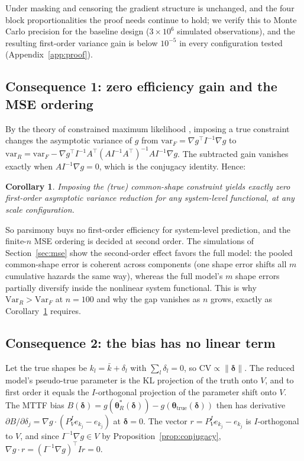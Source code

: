 \documentclass[11pt]{article}
\renewcommand{\v}[1]{\boldsymbol{#1}}
\newcommand{\CV}{\mathrm{CV}}
\newtheorem{corollary}{Corollary}[section]
\begin{document}
Under masking and censoring the gradient structure is unchanged, and the four block proportionalities the proof needs continue to hold; we verify this to Monte Carlo precision for the baseline design ($3\times 10^6$ simulated observations), and the resulting first-order variance gain is below $10^{-5}$ in every configuration tested (Appendix~\ref{app:proof}).

\subsection{Consequence 1: zero efficiency gain and the MSE ordering}

By the theory of constrained maximum likelihood \citep{aitchison1958, silvey1959}, imposing a true constraint changes the asymptotic variance of $g$ from $\mathrm{var}_F = \nabla g^\top I^{-1}\nabla g$ to $\mathrm{var}_R = \mathrm{var}_F - \nabla g^\top I^{-1} A^\top (A I^{-1} A^\top)^{-1} A I^{-1}\nabla g$. The subtracted gain vanishes exactly when $A I^{-1}\nabla g = 0$, which is the conjugacy identity. Hence:

\begin{corollary}
\label{cor:zerogain}
Imposing the (true) common-shape constraint yields exactly zero first-order asymptotic variance reduction for any system-level functional, at any scale configuration.
\end{corollary}

So parsimony buys no first-order efficiency for system-level prediction, and the finite-$n$ MSE ordering is decided at second order. The simulations of Section~\ref{sec:mse} show the second-order effect favors the full model: the pooled common-shape error is coherent across components (one shape error shifts all $m$ cumulative hazards the same way), whereas the full model's $m$ shape errors partially diversify inside the nonlinear system functional. This is why $\mathrm{Var}_R > \mathrm{Var}_F$ at $n=100$ and why the gap vanishes as $n$ grows, exactly as Corollary~\ref{cor:zerogain} requires.

\subsection{Consequence 2: the bias has no linear term}

Let the true shapes be $k_l = \bar k + \delta_l$ with $\sum_l \delta_l = 0$, so $\CV \propto \|\v\delta\|$. The reduced model's pseudo-true parameter is the KL projection of the truth onto $V$, and to first order it equals the $I$-orthogonal projection of the parameter shift onto $V$. The MTTF bias $B(\v\delta) = g(\v\theta_R^\ast(\v\delta)) - g(\v\theta_{\text{true}}(\v\delta))$ then has derivative $\partial B/\partial\delta_j = \nabla g\cdot(P_V^I e_{k_j} - e_{k_j})$ at $\v\delta = 0$. The vector $r = P_V^I e_{k_j} - e_{k_j}$ is $I$-orthogonal to $V$, and since $I^{-1}\nabla g \in V$ by Proposition~\ref{prop:conjugacy}, $\nabla g\cdot r = (I^{-1}\nabla g)^\top I r = 0$.
\end{document}
